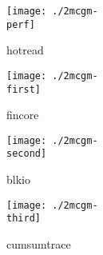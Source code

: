\documentclass{article}
\def \perf {hotread}
\def \first {fincore}
\def \second {blkio}
\def \third {cumsumtrace}
\begin{document}
\begin{landscape}
\begin{figure*}
\begin{subfigure}[t]{\subfigurescale}
\centering
\texttt{[image: ./2mcgm-\\perf]}
\caption{\perf}
\end{subfigure}%
\begin{subfigure}[t]{\subfigurescale}
\centering
\texttt{[image: ./2mcgm-\\first]}
\caption{\first}
\end{subfigure}%
\begin{subfigure}[t]{\subfigurescale}
\centering
\texttt{[image: ./2mcgm-\\second]}
\caption{\second}
\end{subfigure}%
\begin{subfigure}[t]{\subfigurescale}
\centering
\texttt{[image: ./2mcgm-\\third]}
\caption{\third}
\end{subfigure}
\end{figure*}
\end{landscape}
\end{document}
